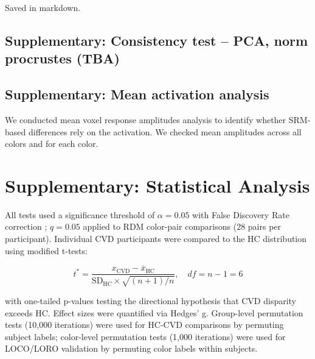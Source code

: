 \documentclass[a4paper,11pt]{article}
\begin{document}
Saved in markdown.




\subsection*{Supplementary: Consistency test -- PCA, norm procrustes (TBA)}




\subsection*{Supplementary: Mean activation analysis}

We conducted mean voxel response amplitudes analysis to identify whether SRM-based differences rely on the activation. We checked mean amplitudes across all colors and for each color.




\section*{Supplementary: Statistical Analysis}

All tests used a significance threshold of $\alpha = 0.05$ with False Discovery Rate correction \cite{benjamini1995}; $q = 0.05$ applied to RDM color-pair comparisons (28 pairs per participant). Individual CVD participants were compared to the HC distribution using  modified t-tests:

\begin{equation}
t^* = \frac{x_{\text{CVD}} - \bar{x}_{\text{HC}}}{\text{SD}_{\text{HC}} \times \sqrt{(n+1)/n}}, \quad df = n-1 = 6
\end{equation}

with one-tailed p-values testing the directional hypothesis that CVD disparity exceeds HC. Effect sizes were quantified via Hedges' g. Group-level permutation tests (10,000 iterations) were used for HC-CVD comparisons by permuting subject labels; color-level permutation tests (1,000 iterations) were used for LOCO/LORO validation by permuting color labels within subjects.
\end{document}
